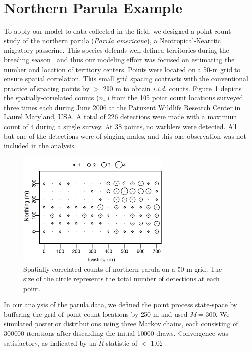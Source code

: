 \section{Northern Parula Example}



To apply our model to data collected in the field, we designed a point
count study of the northern parula ({\it Parula americana}), a
Neotropical-Nearctic migratory passerine. This species defends
well-defined territories during the breeding season
\citep{moldenhaer_regelski_1996}, and thus our modeling effort was focused
on estimating the number and location of territory centers. Points
were located on a 50-m grid to ensure spatial
correlation. This small grid spacing contrasts with the conventional
practice of spacing points by $>$ 200 m to obtain \emph{i.i.d.}
counts. Figure~\ref{fig:nopaDat} depicts the spatially-correlated
counts ($n_{r.}$) from the 105 point count locations
surveyed three times each during June 2006
at the Patuxent Wildlife Research Center in Laurel Maryland, USA.
A total of 226 detections were made with a maximum count of 4 during a
single survey. At 38 points, no warblers were detected. All but one of
the detections were of singing males, and this one observation was
not included in the analysis.



\begin{figure}
  \centering
  \includegraphics[width=3in,height=2.25in]{Ch14/figs/nopa}
  \caption{Spatially-correlated counts of northern parula on a 50-m
    grid. The size of the circle represents the total number of
    detections at each point.}
  \label{fig:nopaDat}
\end{figure}



In our analysis of the parula data, we defined the point process
state-space by buffering the grid of point
count locations by 250 m and used $M=300$. We simulated posterior
distributions using three Markov chains,
each consisting of 300000 iterations after discarding the initial 10000
draws. Convergence was satisfactory, as indicated by an $\hat{R}$
statistic of $<$ 1.02 \citep{gelman_rubin:1992}.

